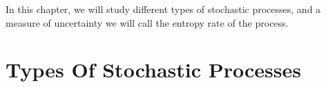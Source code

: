 In this chapter, we will study different types of stochastic processes, and a measure of uncertainty we will call the entropy rate of the process.

\section{Types Of Stochastic Processes}
